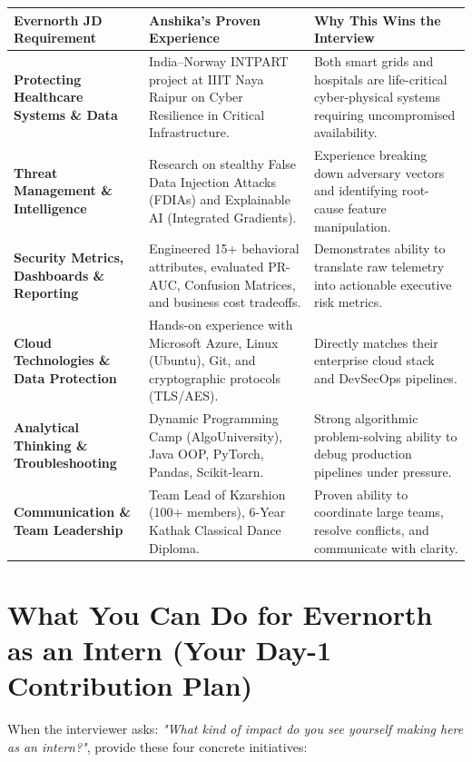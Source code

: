 \documentclass[11pt,a4paper]{article}
\begin{document}
\begin{table}[htbp]
\centering
\small
\begin{tabular}{@{}lp{6.8cm}p{6.8cm}@{}}
\toprule
\textbf{Evernorth JD Requirement} & \textbf{Anshika's Proven Experience} & \textbf{Why This Wins the Interview} \\
\midrule
\textbf{Protecting Healthcare Systems \& Data} & India--Norway INTPART project at IIIT Naya Raipur on Cyber Resilience in Critical Infrastructure. & Both smart grids and hospitals are life-critical cyber-physical systems requiring uncompromised availability. \\
\textbf{Threat Management \& Intelligence} & Research on stealthy False Data Injection Attacks (FDIAs) and Explainable AI (Integrated Gradients). & Experience breaking down adversary vectors and identifying root-cause feature manipulation. \\
\textbf{Security Metrics, Dashboards \& Reporting} & Engineered 15+ behavioral attributes, evaluated PR-AUC, Confusion Matrices, and business cost tradeoffs. & Demonstrates ability to translate raw telemetry into actionable executive risk metrics. \\
\textbf{Cloud Technologies \& Data Protection} & Hands-on experience with Microsoft Azure, Linux (Ubuntu), Git, and cryptographic protocols (TLS/AES). & Directly matches their enterprise cloud stack and DevSecOps pipelines. \\
\textbf{Analytical Thinking \& Troubleshooting} & Dynamic Programming Camp (AlgoUniversity), Java OOP, PyTorch, Pandas, Scikit-learn. & Strong algorithmic problem-solving ability to debug production pipelines under pressure. \\
\textbf{Communication \& Team Leadership} & Team Lead of Kzarshion (100+ members), 6-Year Kathak Classical Dance Diploma. & Proven ability to coordinate large teams, resolve conflicts, and communicate with clarity. \\
\bottomrule
\end{tabular}
\end{table}

\section{What You Can Do for Evernorth as an Intern (Your Day-1 Contribution Plan)}
When the interviewer asks: \textit{"What kind of impact do you see yourself making here as an intern?"}, provide these four concrete initiatives:
\end{document}

